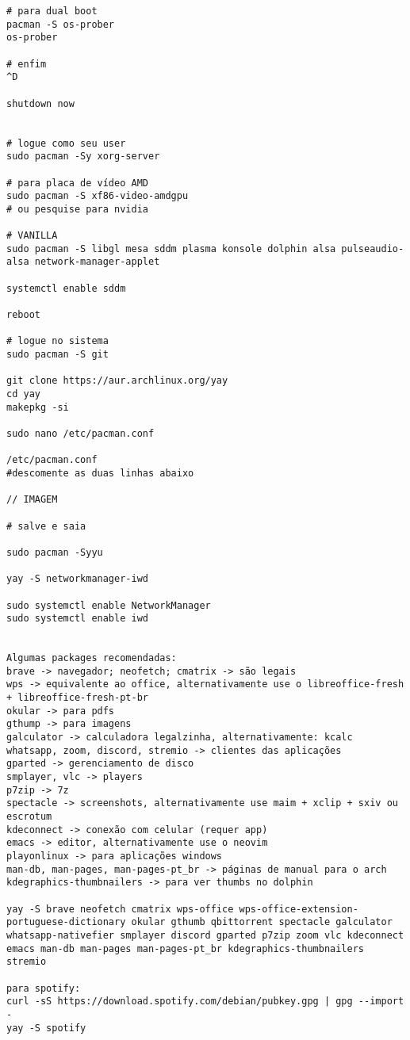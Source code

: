 \documentclass[dark, index]{Iart}
\begin{document}
\begin{lstlisting}
# para dual boot
pacman -S os-prober
os-prober

# enfim
^D

shutdown now


# logue como seu user
sudo pacman -Sy xorg-server

# para placa de vídeo AMD
sudo pacman -S xf86-video-amdgpu
# ou pesquise para nvidia

# VANILLA
sudo pacman -S libgl mesa sddm plasma konsole dolphin alsa pulseaudio-alsa network-manager-applet

systemctl enable sddm

reboot

# logue no sistema
sudo pacman -S git 

git clone https://aur.archlinux.org/yay
cd yay
makepkg -si

sudo nano /etc/pacman.conf

/etc/pacman.conf
#descomente as duas linhas abaixo

// IMAGEM

# salve e saia

sudo pacman -Syyu

yay -S networkmanager-iwd

sudo systemctl enable NetworkManager
sudo systemctl enable iwd


Algumas packages recomendadas:
brave -> navegador; neofetch; cmatrix -> são legais
wps -> equivalente ao office, alternativamente use o libreoffice-fresh + libreoffice-fresh-pt-br
okular -> para pdfs
gthump -> para imagens
galculator -> calculadora legalzinha, alternativamente: kcalc
whatsapp, zoom, discord, stremio -> clientes das aplicações
gparted -> gerenciamento de disco
smplayer, vlc -> players
p7zip -> 7z
spectacle -> screenshots, alternativamente use maim + xclip + sxiv ou escrotum
kdeconnect -> conexão com celular (requer app)
emacs -> editor, alternativamente use o neovim
playonlinux -> para aplicações windows
man-db, man-pages, man-pages-pt_br -> páginas de manual para o arch
kdegraphics-thumbnailers -> para ver thumbs no dolphin

yay -S brave neofetch cmatrix wps-office wps-office-extension-portuguese-dictionary okular gthumb qbittorrent spectacle galculator whatsapp-nativefier smplayer discord gparted p7zip zoom vlc kdeconnect emacs man-db man-pages man-pages-pt_br kdegraphics-thumbnailers stremio

para spotify:
curl -sS https://download.spotify.com/debian/pubkey.gpg | gpg --import -
yay -S spotify


\end{lstlisting}
\end{document}
